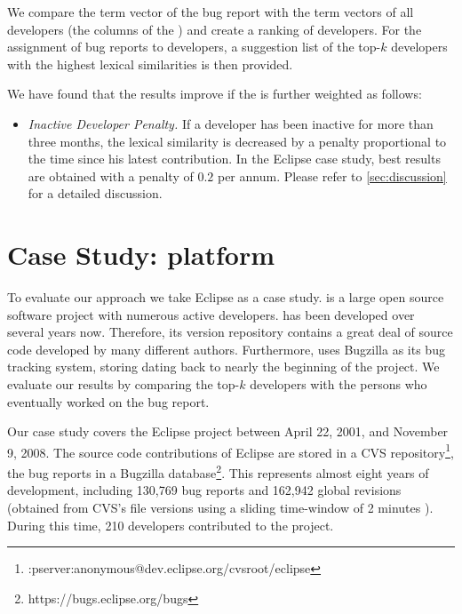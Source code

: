 We compare the term vector of the bug report with the term vectors of all developers (\ie the columns of the \TAM) and create a ranking of developers. For the assignment of bug reports to developers, a suggestion list of the top-$k$ developers with the highest lexical similarities is then provided.

We have found that the results improve if the \TAM is further weighted as follows:
\begin{itemize}
\item \emph{Inactive Developer Penalty.} If a developer has been inactive for more than three months, the lexical similarity is decreased by a penalty proportional to the time since his latest contribution. In the Eclipse case study, best results are obtained with a penalty of $0.2$ per annum. Please refer to \autoref{sec:discussion} for a detailed discussion.
\end{itemize}

\section{Case Study: \EC platform}\label{sec:casestudy}

To evaluate our approach we take Eclipse as a case study. \EC is a large open source software project with numerous active developers.
\EC has been developed over several years now. Therefore, its version repository contains a great deal of source code developed by many different authors.
Furthermore, \EC uses Bugzilla as its bug tracking system, storing \BRs dating back to nearly the beginning of the project.
We evaluate our results by comparing the top-$k$ developers with the persons who eventually worked on the bug report.

Our case study covers the Eclipse project between April 22, 2001, and November 9, 2008. The source code contributions of Eclipse are stored in a CVS repository\footnote{:pserver:anonymous@dev.eclipse.org/cvsroot/eclipse}, the bug reports in a Bugzilla database\footnote{https://bugs.eclipse.org/bugs}. This represents almost eight years of development, including 130,769 bug reports and 162,942 global revisions (obtained from CVS's file versions using a sliding time-window of 2 minutes \cite{Zimm04a}). During this time, 210 developers contributed to the project.

